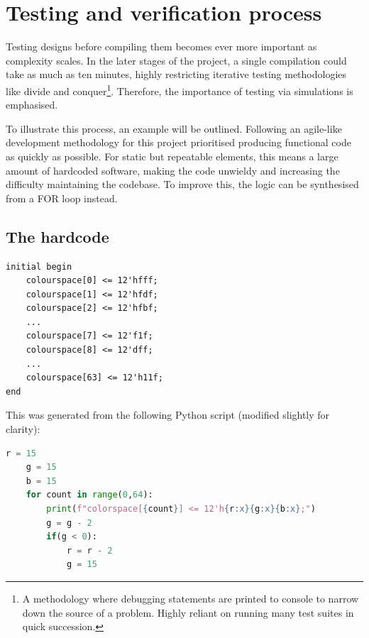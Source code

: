 \section{Testing and verification process}\label{sec:test}
Testing designs before compiling them becomes ever more important as complexity scales. 
In the later stages of the project, a single compilation could take as much as ten minutes, 
highly restricting iterative testing methodologies like divide and conquer\footnote{
    A methodology where debugging statements are printed to console to narrow down the source of a problem.
    Highly reliant on running many test suites in quick succession. 
}. Therefore, the importance of testing via simulations is emphasised. 

To illustrate this process, an example will be outlined. Following an agile-like development methodology 
for this project prioritised producing functional code as quickly as possible. 
For static but repeatable elements, this means a large amount of hardcoded software, 
making the code unwieldy and increasing the difficulty maintaining the codebase.
To improve this, the logic can be synthesised from a FOR loop instead. 

\subsection{The hardcode}
\begin{lstlisting}
initial begin
    colourspace[0] <= 12'hfff;
    colourspace[1] <= 12'hfdf;
    colourspace[2] <= 12'hfbf;
    ... 
    colourspace[7] <= 12'f1f;
    colourspace[8] <= 12'dff;
    ... 
    colourspace[63] <= 12'h11f;
end
\end{lstlisting}
This was generated from the following Python script (modified slightly for clarity):
\begin{lstlisting}[language=Python]
    r = 15
    g = 15
    b = 15
    for count in range(0,64):
        print(f"colorspace[{count}] <= 12'h{r:x}{g:x}{b:x};")
        g = g - 2
        if(g < 0):
            r = r - 2
            g = 15
\end{lstlisting}

